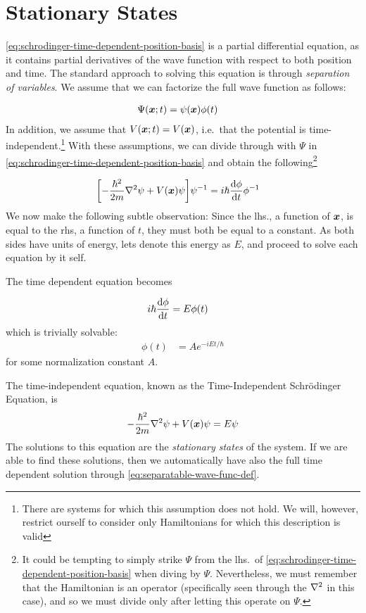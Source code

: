 \documentclass[Thesis.tex]{subfiles}
\begin{document}
\section{Stationary States}

\autoref{eq:schrodinger-time-dependent-position-basis} is a partial differential equation,
as it contains partial derivatives of the wave function with respect to both position and
time. The standard approach to solving this equation is through \emph{separation of
variables}. We assume that we can factorize the full wave function as follows:

\begin{align}
    \Psi(\bm{x}; t) &= \psi(\bm{x})\phi(t)\label{eq:separatable-wave-func-def}
\end{align}
%
In addition, we assume that $V(\bm{x}; t) = V(\bm{x})$, i.e.\ that the potential is
time-independent.\footnote{There are systems for which this assumption does not hold. We
will, however, restrict ourself to consider only Hamiltonians for which this description
is valid} With these assumptions, we can divide through with $\Psi$ in
\autoref{eq:schrodinger-time-dependent-position-basis} and obtain the
following\footnote{It could be tempting to simply strike $\Psi$ from the lhs.\ of
\autoref{eq:schrodinger-time-dependent-position-basis} when diving by $\Psi$. Nevertheless, we
must remember that the Hamiltonian is an operator (specifically seen through the
$\laplacian$ in this case), and so we must divide only after letting this operate on
$\Psi$.}

\begin{align}
    \qty[- \frac{\hbar^2}{2m} \laplacian \psi + V(\vb x)\psi]\psi^{-1} &=
    i\hbar\dv{\phi}{t} \phi^{-1}
\end{align}
%
We now make the following subtle observation: Since the lhs., a function of $\bm{x}$, is
equal to the rhs, a function of $t$, they must both be equal to a constant. As both sides
have units of energy, lets denote this energy as $E$, and proceed to solve each equation
by it self.

The time dependent equation becomes

\begin{align}
    i\hbar \dv{\phi}{t} &= E\phi(t)
\end{align}
which is trivially solvable:
\begin{align}
    \phi(t) &= Ae^{-iEt/\hbar}
\end{align}
for some normalization constant $A$.

The time-independent equation, known as the Time-Independent Schrödinger Equation, is
\begin{align}
    - \frac{\hbar^2}{2m} \laplacian\psi + V(\vb x)\psi =
    E\psi\label{eq:schrodinger-time-independent-position-basis}
\end{align}
The solutions to this equation are the \emph{stationary states} of the system. If
we are able to find these solutions, then we automatically have also the full time
dependent solution through \autoref{eq:separatable-wave-func-def}.
\end{document}
